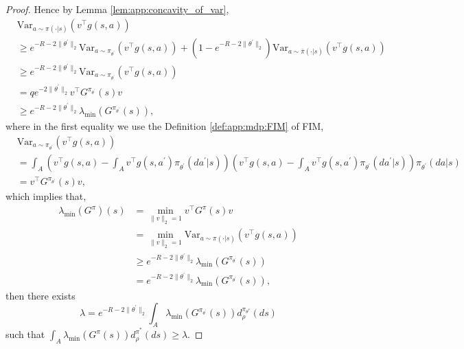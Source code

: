 \documentclass{amsart}
\theoremstyle{definition}
\begin{document}
\begin{proof}
Hence by Lemma \ref{lem:app:concavity_of_var},
\begin{align*} 
&\mathrm{Var}_{a\sim\pi(\cdot | s)}(v^{\top}g(s,a))\\
& \geq e^{-R - 2\|\theta^\prime\|_2} \mathrm{Var}_{a\sim\pi_{\theta^\prime}}(v^{\top}g(s,a))  + \left(1-e^{-R - 2\|\theta^\prime\|_2} \right)\mathrm{Var}_{a\sim\bar{\pi}(\cdot | s)}(v^{\top}g(s,a)) \\
& \geq e^{-R - 2\|\theta^\prime\|_2} \mathrm{Var}_{a\sim\pi_{\theta^\prime}}(v^{\top}g(s,a))\\
& =  q e^{-2\|\theta^\prime\|_2} v^{\top} G^{\pi_{\theta^\prime}}(s) v\\
& \geq e^{-R - 2\|\theta^\prime\|_2}  \lambda_{\min} \left(G^{\pi_{\theta^\prime}}(s)\right) ,
\end{align*}
where in the first equality we use the Definition \ref{def:app:mdp:FIM} of FIM,
{\small
\begin{align*}
&\mathrm{Var}_{a\sim\pi_{\theta^\prime}}(v^{\top}g(s,a)) \\
&=\int_A \left(v^{\top}g(s,a) - \int_A v^{\top}g(s, a^\prime) \pi_{\theta^\prime} ( da^\prime | s) \right)\left(v^{\top}g(s,a) - \int_A v^{\top}g(s, a^\prime) \pi_{\theta^\prime} (da^\prime | s) \right)\pi_{\theta^\prime}(da|s)\\
& = v^{\top} G^{\pi_{\theta^\prime}}(s) v,
\end{align*}
}
which implies that,
\begin{align*}
\lambda_{\min}(G^\pi)(s)& = \min_{\|v\|_2 = 1} v^\top G^\pi(s) v \quad \\
& = \min_{\|v\|_2 = 1} \mathrm{Var}_{a\sim\pi(\cdot | s)}(v^{\top}g(s,a))\\
& \geq e^{-R - 2\|\theta^\prime\|_2} \lambda_{\min} \left(G^{\pi_{\theta^\prime}}(s)\right)\\
& = e^{-R - 2\|\theta^\prime\|_2}  \lambda_{\min} \left(G^{\pi_{\theta^\prime}}(s)\right),
\end{align*}
then there exists 
\[
\lambda = e^{-R - 2\|\theta^\prime\|_2} \int_{A} \lambda_{\min} \left(G^{\pi_{\theta^\prime}}(s) \right)d_\rho^{\pi_{\theta^*}}(ds)
\]
such that $\int_{A}\lambda_{\min} (G^\pi(s))d_\rho^{\pi^*}(ds) \geq \lambda$.
\end{proof}
\end{document}
